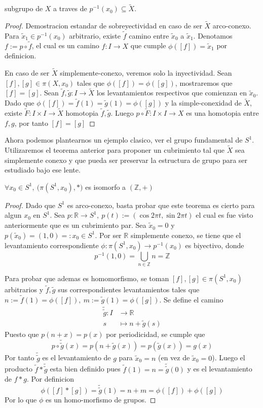 subgrupo de \(X\) a traves de \(p^{-1}(x_0) \subseteq \tilde X\).
\begin{proof}
  Demostracion estandar de sobreyectividad en caso de ser \(\tilde X\)
  arco-conexo. Para \(\tilde x _1 \in p^{-1} (x_0)\) arbitrario, existe
  \(\tilde f\) camino entre \(\tilde x _0 \) a \(\tilde x _1\).
  Denotamos \(f := p \circ \tilde f\), el cual es un camino \(f : I \to
  X\) que cumple \(\phi ([f]) = \tilde x _1\) por definicion.

  En caso de ser \(\tilde X\) simplemente-conexo, veremos solo la
  inyectividad. Sean \([f],[g] \in \pi (X, x_0)\) tales que \(\phi([f])
  = \phi([g])\), mostraremos que \([f] = [g]\). Sean \(\tilde f, \tilde
  g : I \to \tilde X\) los levantamientos respectivos que comienzan en
  \(\tilde x _0\). Dado que \(\phi([f]) = \tilde f (1) = \tilde g (1) =
  \phi([g])\) y la simple-conexidad de \(\tilde X\), existe \(\tilde F :
  I \times I \to \tilde X\) homotopia \(\tilde f, \tilde g\). Luego \(p
  \circ \tilde F : I \times I \to X \) es una homotopia entre \(f, g\),
  por tanto \([f] = [g]\)
\end{proof}
Ahora podemos plantearnos un ejemplo clasico, ver el grupo fundamental
de \(S^1\). Utilizaremos el teorema anterior para proponer un
cubrimiento tal que \(\tilde X\) sea simplemente conexo y que pueda ser
preservar la estructura de grupo para ser estudiado bajo ese lente.
\begin{teorema}
  \(\forall x_0 \in S^1,\ \big( \pi (S^1,x_0), * \big)\) es isomorfo a
  \((\mathbb Z, +)\)
\end{teorema}
\begin{proof}
  Dado que \(S^1\) es arco-conexo, basta probar que este teorema es
  cierto para algun \(x_0\) en \(S^1\). Sea \(p : \mathbb R \to S^1,\
  p(t) := (\cos 2 \pi t, \sin 2 \pi t)\) el cual es fue visto anteriormente
  que es un cubrimiento par. Sea \(\tilde x _0 = 0\) y \( p(\tilde x _0) =
  (1,0) =: x_0 \in S^1\). Por ser \(\mathbb R\) simplemente conexo, se
  tiene que el levantamiento correspondiente \(\phi : \pi (S^1, x_0) \to
  p^{-1} (x_0)\) es biyectivo, donde
  \[ p^{-1} (1,0) = \bigcup_{n \in \mathbb Z} n = \mathbb Z \]

  Para probar que ademas es homomorfismo, se toman \([f], [g] \in \pi
  (S^1, x_0)\) arbitrarios y \(\tilde f, \tilde g\) sus correspondientes
  levantamientos tales que \(n := \tilde f (1) = \phi ([f]),\ m :=
  \tilde g (1) = \phi ([g])\). Se define el camino
  \begin{align*}
    \tilde{\tilde g} : I &\longrightarrow \mathbb R \\
    s &\longmapsto n + \tilde g (s)
  \end{align*}
  Puesto que \(p(n + x) = p(x)\) por periodicidad, se cumple que
  \[ p \circ \tilde{\tilde g} (x) = p (n + \tilde g (x)) = p (\tilde g
    (x)) = g (x) \]
  Por tanto \(\tilde{\tilde g}\) es el levantamiento de \(g\) para
  \(\tilde x_0 = n\) (en vez de \(\tilde x_0 = 0\)). Luego el producto
  \(\tilde f * \tilde{\tilde g}\) esta bien definido pues \(\tilde f (1)
  = n = \tilde{\tilde g} (0)\) y es el levantamiento de \(f * g\). Por
  definicion
  \[ \phi ([f] * [g]) = \tilde{\tilde g} (1) = n + m = \phi ([f]) + \phi ([g]) \]
  Por lo que \(\phi\) es un homo-morfismo de grupos.
\end{proof}
